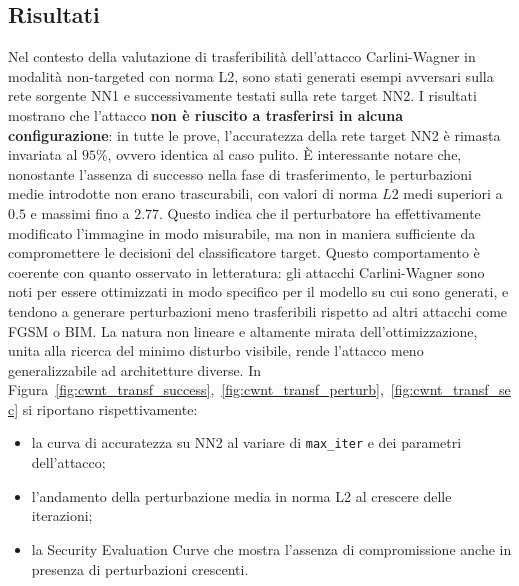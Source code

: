         \subsection{Risultati}
            Nel contesto della valutazione di trasferibilità dell'attacco Carlini-Wagner in modalità non-targeted con norma L2, sono stati generati esempi avversari sulla rete sorgente NN1 e successivamente testati sulla rete target NN2. I risultati mostrano che l'attacco \textbf{non è riuscito a trasferirsi in alcuna configurazione}: in tutte le prove, l’accuratezza della rete target NN2 è rimasta invariata al $95\%$, ovvero identica al caso pulito.
            È interessante notare che, nonostante l'assenza di successo nella fase di trasferimento, le perturbazioni medie introdotte non erano trascurabili, con valori di norma $L2$ medi superiori a $0.5$ e massimi fino a $2.77$. Questo indica che il perturbatore ha effettivamente modificato l'immagine in modo misurabile, ma non in maniera sufficiente da compromettere le decisioni del classificatore target.
            Questo comportamento è coerente con quanto osservato in letteratura: gli attacchi Carlini-Wagner sono noti per essere ottimizzati in modo specifico per il modello su cui sono generati, e tendono a generare perturbazioni meno trasferibili rispetto ad altri attacchi come FGSM o BIM. La natura non lineare e altamente mirata dell’ottimizzazione, unita alla ricerca del minimo disturbo visibile, rende l’attacco meno generalizzabile ad architetture diverse.
            In Figura~\ref{fig:cwnt_transf_success},~\ref{fig:cwnt_transf_perturb},~\ref{fig:cwnt_transf_sec} si riportano rispettivamente:
            \begin{itemize}
                \item la curva di accuratezza su NN2 al variare di \texttt{max\_iter} e dei parametri dell’attacco;
                
                \item l’andamento della perturbazione media in norma L2 al crescere delle iterazioni;
                
                \item la Security Evaluation Curve che mostra l’assenza di compromissione anche in presenza di perturbazioni crescenti.
            \end{itemize}
            
